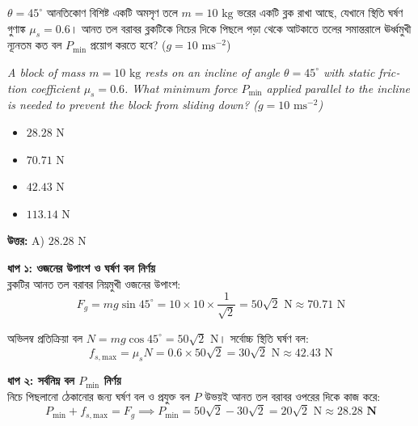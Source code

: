 \documentclass[12pt, a4paper]{article}
\begin{document}
\newpage
\begin{tcolorbox}[questionbox={প্রশ্ন (Question) 1}]
\noindent
$\theta = 45^\circ$ আনতিকোণ বিশিষ্ট একটি অমসৃণ তলে $m = 10\text{ kg}$ ভরের একটি ব্লক রাখা আছে, যেখানে স্থিতি ঘর্ষণ গুণাঙ্ক $\mu_s = 0.6$। আনত তল বরাবর ব্লকটিকে নিচের দিকে পিছলে পড়া থেকে আটকাতে তলের সমান্তরালে ঊর্ধ্বমুখী ন্যূনতম কত বল $P_{\text{min}}$ প্রয়োগ করতে হবে? ($g = 10\text{ ms}^{-2}$)
\vspace{0.8em}
\begin{english}
\noindent\textit{\color{darkgray}
A block of mass $m = 10\text{ kg}$ rests on an incline of angle $\theta = 45^\circ$ with static friction coefficient $\mu_s = 0.6$. What minimum force $P_{\text{min}}$ applied parallel to the incline is needed to prevent the block from sliding down? ($g = 10\text{ ms}^{-2}$)
}
\end{english}
\end{tcolorbox}

\begin{itemize}[label={}, leftmargin=1cm, itemsep=0.5em]
\item[\textbf{A)}] $28.28\text{ N}$
\item[\textbf{B)}] $70.71\text{ N}$
\item[\textbf{C)}] $42.43\text{ N}$
\item[\textbf{D)}] $113.14\text{ N}$
\end{itemize}
\vspace{0.5em}

\begin{tcolorbox}[answerbox]
\textbf{\color{success} উত্তর:} A) $28.28\text{ N}$
\end{tcolorbox}
\vspace{1em}

\begin{tcolorbox}[solutionbox={সমাধান (Solution)}]
\noindent
\textbf{ধাপ ১: ওজনের উপাংশ ও ঘর্ষণ বল নির্ণয়} \\
ব্লকটির আনত তল বরাবর নিম্নমুখী ওজনের উপাংশ:
\[F_g = m g \sin 45^\circ = 10 \times 10 \times \frac{1}{\sqrt{2}} = 50\sqrt{2}\text{ N} \approx 70.71\text{ N}\]

অভিলম্ব প্রতিক্রিয়া বল $N = m g \cos 45^\circ = 50\sqrt{2}\text{ N}$।
সর্বোচ্চ স্থিতি ঘর্ষণ বল:
\[f_{s,\text{max}} = \mu_s N = 0.6 \times 50\sqrt{2} = 30\sqrt{2}\text{ N} \approx 42.43\text{ N}\]

\vspace{0.5em}
\noindent\textbf{ধাপ ২: সর্বনিম্ন বল $P_{\text{min}}$ নির্ণয়} \\
নিচে পিছলানো ঠেকানোর জন্য ঘর্ষণ বল ও প্রযুক্ত বল $P$ উভয়ই আনত তল বরাবর ওপরের দিকে কাজ করে:
\[P_{\text{min}} + f_{s,\text{max}} = F_g \implies P_{\text{min}} = 50\sqrt{2} - 30\sqrt{2} = 20\sqrt{2}\text{ N} \approx \mathbf{28.28\text{ N}}\]
\end{tcolorbox}
\end{document}
